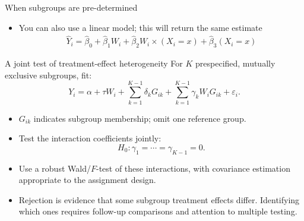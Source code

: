 \documentclass[xcolor={dvipsnames},handout]{beamer}
\begin{document}

\begin{frame}{When subgroups are pre-determined}



\begin{itemize}
\item You can also use a linear model; this will return the same estimate
\begin{align*}
\hat Y_i = \hat \beta_0 + \hat \beta_1 W_i + \hat \beta_2 W_i\times (X_i=x) + \hat \beta_3 (X_i=x)
\end{align*}
\end{itemize}

\end{frame}




\begin{frame}{A joint test of treatment-effect heterogeneity}
For $K$ prespecified, mutually exclusive subgroups, fit:
\[
Y_i = \alpha + \tau W_i
  + \sum_{k=1}^{K-1}\delta_k G_{ik}
  + \sum_{k=1}^{K-1}\gamma_k W_i G_{ik} + \varepsilon_i.
\]
\begin{itemize}
\item $G_{ik}$ indicates subgroup membership; omit one reference group.
\item Test the interaction coefficients jointly:
\[
H_0:\gamma_1=\cdots=\gamma_{K-1}=0.
\]
\item Use a robust Wald/$F$-test of these interactions, with covariance estimation appropriate to the assignment design.
\item Rejection is evidence that some subgroup treatment effects differ. Identifying which ones requires follow-up comparisons and attention to multiple testing.
\end{itemize}
\end{frame}
\end{document}
